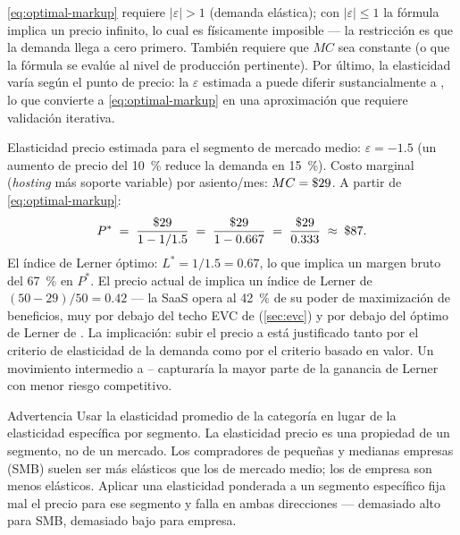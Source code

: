 \cref{eq:optimal-markup} requiere \(|\varepsilon| > 1\) (demanda elástica); con \(|\varepsilon| \le 1\) la fórmula implica un precio infinito, lo cual es físicamente imposible --- la restricción es que la demanda llega a cero primero. También requiere que \(MC\) sea constante (o que la fórmula se evalúe al nivel de producción pertinente). Por último, la elasticidad varía según el punto de precio: la \(\varepsilon\) estimada a  puede diferir sustancialmente a , lo que convierte a \cref{eq:optimal-markup} en una aproximación que requiere validación iterativa.

\begin{example}
Elasticidad precio estimada para el segmento de mercado medio: \(\varepsilon = -1.5\) (un aumento de precio del \qty{10}{\percent} reduce la demanda en \qty{15}{\percent}). Costo marginal (\emph{hosting} más soporte variable) por asiento/mes: \(MC = \$\num{29}\). A partir de \cref{eq:optimal-markup}:
\[
  P^* \;=\; \frac{\$\num{29}}{1 - 1/1.5} \;=\; \frac{\$\num{29}}{1 - 0.667} \;=\; \frac{\$\num{29}}{0.333} \;\approx\; \$\num{87}.
\]
El índice de Lerner óptimo: \(L^* = 1/1.5 = 0.67\), lo que implica un margen bruto del \qty{67}{\percent} en \(P^*\). El precio actual de  implica un índice de Lerner de \((50-29)/50 = 0.42\) --- la SaaS opera al \qty{42}{\percent} de su poder de maximización de beneficios, muy por debajo del techo EVC de  (\cref{sec:evc}) y por debajo del óptimo de Lerner de . La implicación: subir el precio a  está justificado tanto por el criterio de elasticidad de la demanda como por el criterio basado en valor. Un movimiento intermedio a -- capturaría la mayor parte de la ganancia de Lerner con menor riesgo competitivo.
\end{example}

\begin{admonition}{Advertencia}
Usar la elasticidad promedio de la categoría en lugar de la elasticidad específica por segmento. La elasticidad precio es una propiedad de un segmento, no de un mercado. Los compradores de pequeñas y medianas empresas (SMB) suelen ser más elásticos que los de mercado medio; los de empresa son menos elásticos. Aplicar una elasticidad ponderada a un segmento específico fija mal el precio para ese segmento y falla en ambas direcciones --- demasiado alto para SMB, demasiado bajo para empresa.
\end{admonition}

